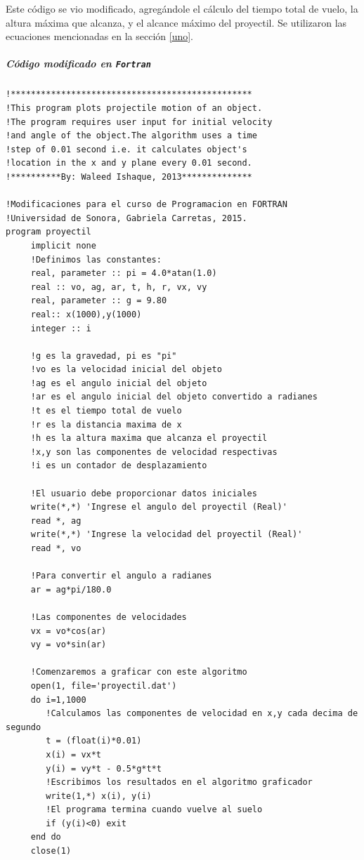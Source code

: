 \documentclass[a4paper]{article}
\begin{document}
Este código se vio modificado, agregándole el cálculo del tiempo total de vuelo, la altura máxima que alcanza, y el alcance máximo del proyectil. Se utilizaron las ecuaciones mencionadas en la sección \ref{uno}.

\subparagraph{Código modificado en \texttt{Fortran}}
\begin{verbatim}
!************************************************  
!This program plots projectile motion of an object.  
!The program requires user input for initial velocity   
!and angle of the object.The algorithm uses a time   
!step of 0.01 second i.e. it calculates object's  
!location in the x and y plane every 0.01 second.  
!**********By: Waleed Ishaque, 2013************** 

!Modificaciones para el curso de Programacion en FORTRAN
!Universidad de Sonora, Gabriela Carretas, 2015.
program proyectil 
     implicit none  
     !Definimos las constantes:
     real, parameter :: pi = 4.0*atan(1.0) 
     real :: vo, ag, ar, t, h, r, vx, vy  
     real, parameter :: g = 9.80  
     real:: x(1000),y(1000)  
     integer :: i 

     !g es la gravedad, pi es "pi"
     !vo es la velocidad inicial del objeto   
     !ag es el angulo inicial del objeto 
     !ar es el angulo inicial del objeto convertido a radianes  
     !t es el tiempo total de vuelo
     !r es la distancia maxima de x
     !h es la altura maxima que alcanza el proyectil
     !x,y son las componentes de velocidad respectivas
     !i es un contador de desplazamiento

     !El usuario debe proporcionar datos iniciales  
     write(*,*) 'Ingrese el angulo del proyectil (Real)'   
     read *, ag   
     write(*,*) 'Ingrese la velocidad del proyectil (Real)'   
     read *, vo   
     
     !Para convertir el angulo a radianes   
     ar = ag*pi/180.0
     
     !Las componentes de velocidades
     vx = vo*cos(ar)
     vy = vo*sin(ar)

     !Comenzaremos a graficar con este algoritmo   
     open(1, file='proyectil.dat')   
     do i=1,1000
        !Calculamos las componentes de velocidad en x,y cada decima de segundo  
        t = (float(i)*0.01)   
        x(i) = vx*t   
        y(i) = vy*t - 0.5*g*t*t   
        !Escribimos los resultados en el algoritmo graficador   
        write(1,*) x(i), y(i)  
        !El programa termina cuando vuelve al suelo   
        if (y(i)<0) exit   
     end do
     close(1)
     

\end{verbatim}
\end{document}

